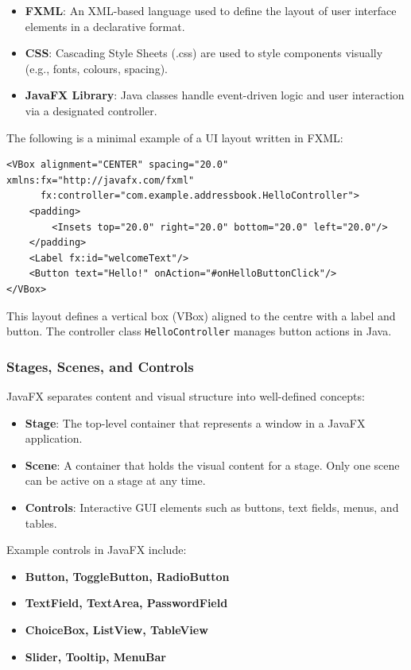 \documentclass{article}
\newcommand{\codecmd}[1]{\textcolor[rgb]{0,0.5,0}{\texttt{#1}}}
\begin{document}
\begin{itemize}
    \item \textbf{FXML}: An XML-based language used to define the layout of user interface elements in a declarative format.
    \item \textbf{CSS}: Cascading Style Sheets (.css) are used to style components visually (e.g., fonts, colours, spacing).
    \item \textbf{JavaFX Library}: Java classes handle event-driven logic and user interaction via a designated controller.
\end{itemize}

The following is a minimal example of a UI layout written in FXML:

\begin{verbatim}
<VBox alignment="CENTER" spacing="20.0" xmlns:fx="http://javafx.com/fxml"
      fx:controller="com.example.addressbook.HelloController">
    <padding>
        <Insets top="20.0" right="20.0" bottom="20.0" left="20.0"/>
    </padding>
    <Label fx:id="welcomeText"/>
    <Button text="Hello!" onAction="#onHelloButtonClick"/>
</VBox>
\end{verbatim}

This layout defines a vertical box (VBox) aligned to the centre with a label and button. The controller class \codecmd{HelloController} manages button actions in Java.

\subsubsection{Stages, Scenes, and Controls}

JavaFX separates content and visual structure into well-defined concepts:

\begin{itemize}
    \item \textbf{Stage}: The top-level container that represents a window in a JavaFX application.
    \item \textbf{Scene}: A container that holds the visual content for a stage. Only one scene can be active on a stage at any time.
    \item \textbf{Controls}: Interactive GUI elements such as buttons, text fields, menus, and tables.
\end{itemize}

Example controls in JavaFX include:

\begin{itemize}
    \item \textbf{Button, ToggleButton, RadioButton}
    \item \textbf{TextField, TextArea, PasswordField}
    \item \textbf{ChoiceBox, ListView, TableView}
    \item \textbf{Slider, Tooltip, MenuBar}
\end{itemize}
\end{document}

